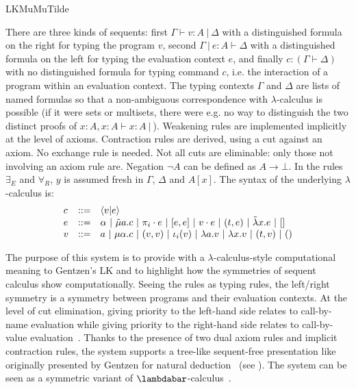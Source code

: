 \begin{entry}{LKMuMuTilde}
\begin{calculus}
\end{calculus}
\begin{clarifications}
There are three kinds of sequents: first $\Gamma \vdash v:A ~|~
\Delta$ with a distinguished formula on the right for typing the
program $v$, second $\Gamma ~|~ e:A \vdash \Delta$ with a
distinguished formula on the left for typing the evaluation context
$e$, and finally $c : (\Gamma \vdash \Delta)$ with no distinguished
formula for typing command $c$, i.e. the interaction of a program
within an evaluation context. The typing contexts $\Gamma$ and
$\Delta$ are lists of named formulas so that a non-ambiguous
correspondence with $\lambda$-calculus is possible (if it were sets or
multisets, there were e.g. no way to distinguish the two distinct
proofs of $x:A, x:A \vdash x:A ~|~$). Weakening rules are implemented
implicitly at the level of axioms. Contraction rules are derived,
using a cut against an axiom. No exchange rule is needed.  Not all
cuts are eliminable: only those not involving an axiom rule are.
Negation $\neg A$ can be defined as $A \rightarrow \bot$. In the rules
$\exists_E$ and $\forall_R$, $y$ is assumed fresh in $\Gamma$,
$\Delta$ and $A[x]$. The syntax of the underlying $\lambda$-calculus
is:
$$
\begin{array}{lll}
c & ::= & \langle v | e \rangle\\
e & ::= & \alpha ~|~ \tilde\mu a.c ~|~ \pi_i\cdot e ~|~ [e,e] ~|~ v \cdot e ~|~ (t,e) ~|~ \tilde\lambda x.e ~|~ []\\
v & ::= & a ~|~ \mu\alpha.c ~|~ (v,v) ~|~ \iota_i(v) ~|~ \lambda a.v ~|~ \lambda x.v ~|~ (t,v) ~|~ ()\\
\end{array}
$$
\end{clarifications}

\begin{history}
The purpose of this system is to provide with a
$\lambda$-calculus-style computational meaning to Gentzen's LK
 and to highlight how the symmetries of sequent
calculus show computationally. Seeing the rules as typing rules, the
left/right symmetry is a symmetry between programs and their
evaluation contexts. At the level of cut elimination, giving priority
to the left-hand side relates to call-by-name evaluation while giving
priority to the right-hand side relates to call-by-value
evaluation~\cite{CurienHerbelin00}. Thanks to the presence of two dual
axiom rules and implicit contraction rules, the system supports a
tree-like sequent-free presentation like originally presented by
Gentzen for natural deduction~\cite{HerbelinHdR} (see
). The system can be seen as a symmetric variant
of $\lambdabar$-calculus~.


\end{history}
\end{entry}
